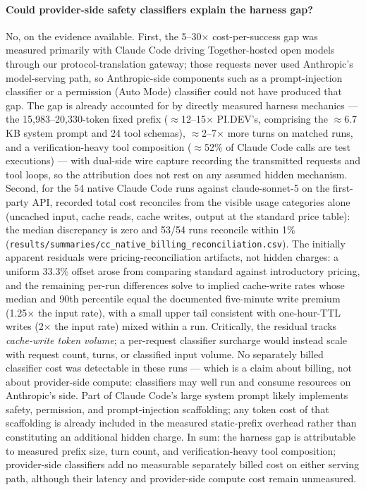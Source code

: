 \documentclass[11pt]{article}
\newcommand{\pidev}{PI.DEV}
\newcommand{\cc}{Claude Code}
\newcommand{\xd}{$\times$}
\begin{document}
\paragraph{Could provider-side safety classifiers explain the harness
gap?} No, on the evidence available. First, the 5--30\xd{} cost-per-success
gap was measured primarily with \cc{} driving Together-hosted open models
through our protocol-translation gateway; those requests never used
Anthropic's model-serving path, so Anthropic-side components such as a
prompt-injection classifier or a permission (Auto Mode) classifier could
not have produced that gap. The gap is already accounted for by directly
measured harness mechanics --- the 15{,}983--20{,}330-token fixed prefix
($\approx$12--15\xd{} \pidev's, comprising the $\approx$6.7\,KB system
prompt and 24 tool schemas), $\approx$2--7\xd{} more turns on matched
runs, and a verification-heavy tool composition ($\approx$52\% of \cc{}
calls are test executions) --- with dual-side wire capture recording the
transmitted requests and tool loops, so the attribution does not rest on
any assumed hidden mechanism. Second, for the 54 native \cc{} runs against
claude-sonnet-5 on the first-party API, recorded total cost reconciles
from the visible usage categories alone (uncached input, cache reads,
cache writes, output at the standard price table): the median discrepancy
is zero and 53/54 runs reconcile within 1\%
(\texttt{results/summaries/cc\_native\_billing\_reconciliation.csv}).
The initially apparent residuals were pricing-reconciliation artifacts,
not hidden charges: a uniform 33.3\% offset arose from comparing standard
against introductory pricing, and the remaining per-run differences solve
to implied cache-write rates whose median and 90th percentile equal the
documented five-minute write premium (1.25\xd{} the input rate), with a small
upper tail consistent with one-hour-TTL writes (2\xd{} the input rate)
mixed within a run. Critically, the residual tracks \emph{cache-write
token volume}; a per-request classifier surcharge would instead scale
with request count, turns, or classified input volume. No separately
billed classifier cost was detectable in these runs --- which is a claim
about billing, not about provider-side compute: classifiers may well run
and consume resources on Anthropic's side. Part of \cc{}'s large system
prompt likely implements safety, permission, and prompt-injection
scaffolding; any token cost of that scaffolding is already included in
the measured static-prefix overhead rather than constituting an
additional hidden charge. In sum: the harness gap is attributable to
measured prefix size, turn count, and verification-heavy tool
composition; provider-side classifiers add no measurable separately
billed cost on either serving path, although their latency and
provider-side compute cost remain unmeasured.
\end{document}
